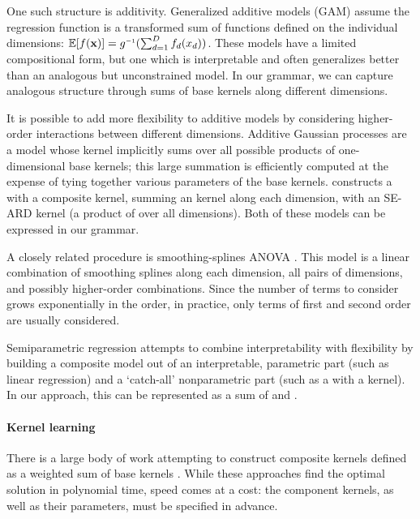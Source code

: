 One such structure is additivity.
Generalized additive models (GAM) assume the regression function is a transformed sum of functions defined on the individual dimensions: $\expect[f(\vx)] = g\inv(\sum_{d=1}^D f_d(x_d))$.
These models have a limited compositional form, but one which is interpretable and often generalizes better than an analogous but unconstrained model.
In our grammar, we can capture analogous structure through sums of base kernels along different dimensions.

It is possible to add more flexibility to additive models by considering higher-order interactions between different dimensions. 
Additive Gaussian processes \citep{Duvenaud2011-wb} are a \gp{} model whose kernel implicitly sums over all possible products of one-dimensional base kernels; this large summation is efficiently computed at the expense of tying together various parameters of the base kernels.  
\citet{Plate1999-xh} constructs a \gp{} with a composite kernel, summing an \kSE{} kernel along each dimension, with an SE-ARD kernel (\ie a product of \kSE{} over all dimensions).
Both of these models can be expressed in our grammar.

A closely related procedure is smoothing-splines ANOVA \cite{Wahba1990-ml, Gu2002-at, Wahba2004-fk}.
This model is a linear combination of smoothing splines along each dimension, all pairs of dimensions, and possibly higher-order combinations.
Since the number of terms to consider grows exponentially in the order, in practice, only terms of first and second order are usually considered.

Semiparametric regression \citep[e.g.][]{Ruppert2003-uq} attempts to combine interpretability with flexibility by building  a composite model out of an interpretable, parametric part (such as linear regression) and a `catch-all' nonparametric part (such as a \gp{} with a \kSE kernel).
In our approach, this can be represented as a sum of \kSE{} and \kLin{}.

\paragraph{Kernel learning}
There is a large body of work attempting to construct composite kernels defined as a weighted sum of base kernels \citep[e.g.][]{Christoudias2009-an, Bach2009-hr}.
While these approaches find the optimal solution in polynomial time, speed comes at a cost: the component kernels, as well as their parameters, must be specified in advance.

